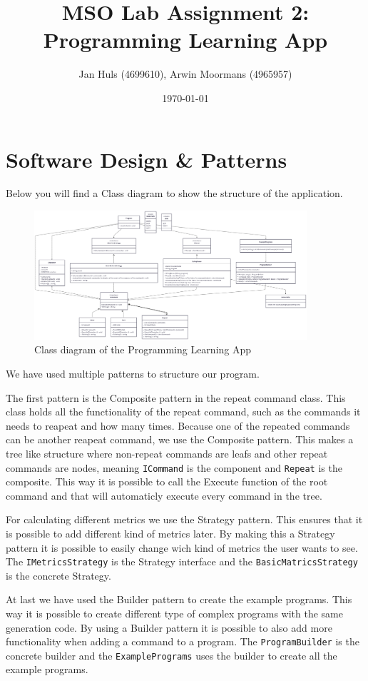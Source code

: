 \documentclass[11pt,a4paper]{article}
\date{\monthyear\today}
\title{\textbf{MSO Lab Assignment 2:\\
Programming Learning App}}
\author{Jan Huls (4699610), Arwin Moormans (4965957)}
\begin{document}
\maketitle
\section*{Software Design \& Patterns}
Below you will find a Class diagram to show the structure of the application.

\begin{figure}[htbp]\label{fig:class-diagram}
  \centering
  \includegraphics[width=0.9\textwidth]{class_diagram.png}
  \caption{\small{Class diagram of the Programming Learning App}}
\end{figure}
We have used multiple patterns to structure our program. 

The first pattern is the Composite pattern in the repeat command class.
This class holds all the functionality of the repeat command, such as the commands it needs to reapeat and how many times.
Because one of the repeated commands can be another reapeat command, we use the Composite pattern.
This makes a tree like structure where non-repeat commands are leafs and other repeat commands are nodes, meaning \texttt{ICommand} is the component and \texttt{Repeat} is the composite.
This way it is possible to call the Execute function of the root command and that will automaticly execute every command in the tree.

For calculating different metrics we use the Strategy pattern.
This ensures that it is possible to add different kind of metrics later.
By making this a Strategy pattern it is possible to easily change wich kind of metrics the user wants to see.
The \texttt{IMetricsStrategy} is the Strategy interface and the \texttt{BasicMatricsStrategy} is the concrete Strategy.

At last we have used the Builder pattern to create the example programs.
This way it is possible to create different type of complex programs with the same generation code.
By using a Builder pattern it is possible to also add more functionality when adding a command to a program.
The \texttt{ProgramBuilder} is the concrete builder and the \texttt{ExamplePrograms} uses the builder to create all the example programs.
\end{document}
